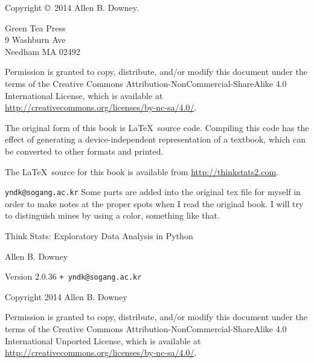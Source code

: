 \documentclass[12pt]{book}
\makeatletter
\newcommand{\thetitle}{Think Stats}
\newcommand{\thesubtitle}{Exploratory Data Analysis in Python}
\newcommand{\theversion}{2.0.36 {\tt + yndk@sogang.ac.kr} }
\makeatother
\begin{document}
\begin{latexonly}
\begin{flushright}
\end{flushright}


\pagebreak
\thispagestyle{empty}

{\small
Copyright \copyright ~2014 Allen B. Downey.


\vspace{0.2in}

\begin{flushleft}
Green Tea Press       \\
9 Washburn Ave \\
Needham MA 02492
\end{flushleft}

Permission is granted to copy, distribute, and/or modify this document
under the terms of the Creative Commons
Attribution-NonCommercial-ShareAlike 4.0 International License, which
is available at
\url{http://creativecommons.org/licenses/by-nc-sa/4.0/}.

The original form of this book is \LaTeX\ source code.  Compiling this
code has the effect of generating a device-independent representation
of a textbook, which can be converted to other formats and printed.

The \LaTeX\ source for this book is available from
\url{http://thinkstats2.com}.

\vspace{0.2in}

{\tt yndk@sogang.ac.kr}
Some parts are added into the original tex file for myself in order to make notes at the proper spots when I read the original book. I will try to distinguish mines by using a color, something like that.
} %

\end{latexonly}



\begin{htmlonly}


{\Large \thetitle: \thesubtitle}

{\large Allen B. Downey}

Version \theversion

\vspace{0.25in}

Copyright 2014 Allen B. Downey

\vspace{0.25in}

Permission is granted to copy, distribute, and/or modify this document
under the terms of the Creative Commons 
Attribution-NonCommercial-ShareAlike 4.0 International
Unported License, which is available at
\url{http://creativecommons.org/licenses/by-nc-sa/4.0/}.

\setcounter{chapter}{-1}

\end{htmlonly}
\end{document}
